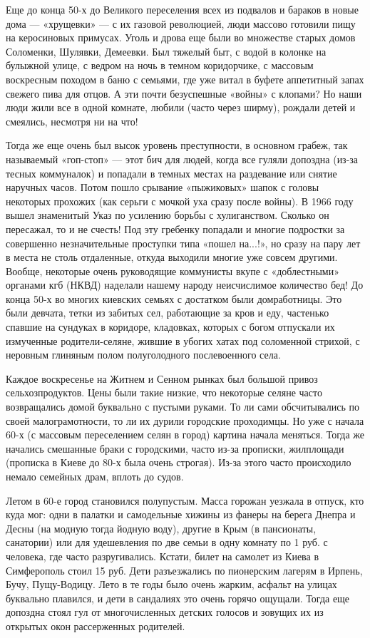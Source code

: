 Еще до конца 50-х до Великого переселения всех из подвалов и бараков в новые
дома --- «хрущевки» --- с их газовой революцией, люди массово готовили пищу на
керосиновых примусах. Уголь и дрова еще были во множестве старых домов
Соломенки, Шулявки, Демеевки. Был тяжелый быт, с водой в колонке на булыжной
улице, с ведром на ночь в темном коридорчике, с массовым воскресным походом в
баню с семьями, где уже витал в буфете аппетитный запах свежего пива для отцов.
А эти почти безуспешные «войны» с клопами? Но наши люди жили все в одной
комнате, любили (часто через ширму), рождали детей и смеялись, несмотря ни на
что! 

Тогда же еще очень был высок уровень преступности, в основном грабеж, так
называемый «гоп-стоп» --- этот бич для людей, когда все гуляли допоздна (из-за
тесных коммуналок) и попадали в темных местах на раздевание или снятие наручных
часов. Потом пошло срывание «пыжиковых» шапок с головы некоторых прохожих (как
серьги с мочкой уха сразу после войны). В 1966 году вышел знаменитый Указ по
усилению борьбы с хулиганством. Сколько он пересажал, то и не счесть! Под эту
гребенку попадали и многие подростки за совершенно незначительные проступки
типа «пошел на...!», но сразу на пару лет в места не столь отдаленные, откуда
выходили многие уже совсем другими. Вообще, некоторые очень руководящие
коммунисты вкупе с «доблестными» органами кгб (НКВД) наделали нашему народу
неисчислимое количество бед!  До конца 50-х во многих киевских семьях с
достатком были домработницы. Это были девчата, тетки из забитых сел, работающие
за кров и еду, частенько спавшие на сундуках в коридоре, кладовках, которых с
богом отпускали их измученные родители-селяне, жившие в убогих хатах под
соломенной стрихой, с неровным глиняным полом полуголодного послевоенного села. 

Каждое воскресенье на Житнем и Сенном рынках был большой привоз
сельхозпродуктов. Цены были такие низкие, что некоторые селяне часто
возвращались домой буквально с пустыми руками. То ли сами обсчитывались по
своей малограмотности, то ли их дурили городские проходимцы. Но уже с начала
60-х (с массовым переселением селян в город) картина начала меняться. Тогда же
начались смешанные браки с городскими, часто из-за прописки, жилплощади
(прописка в Киеве до 80-х была очень строгая). Из-за этого часто происходило
немало семейных драм, вплоть до судов. 


Летом в 60-е город становился полупустым. Масса горожан уезжала в отпуск, кто
куда мог: одни в палатки и самодельные хижины из фанеры на берега Днепра и
Десны (на модную тогда йодную воду), другие в Крым (в пансионаты, санатории)
или для удешевления по две семьи в одну комнату по 1 руб. с человека, где часто
разругивались. Кстати, билет на самолет из Киева в Симферополь стоил 15 руб.
Дети разъезжались по пионерским лагерям в Ирпень, Бучу, Пущу-Водицу. Лето в те
годы было очень жарким, асфальт на улицах буквально плавился, и дети в
сандалиях это очень горячо ощущали. Тогда еще допоздна стоял гул от
многочисленных детских голосов и зовущих их из открытых окон рассерженных
родителей. 

